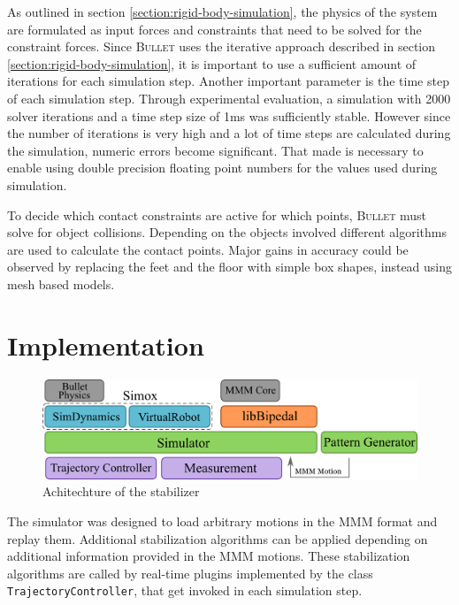 \documentclass[english,ngerman]{KITreprt}
\newcommand{\name}[1]{\textsc{#1}}
\begin{document}
As outlined in section \ref{section:rigid-body-simulation}, the physics
of the system are formulated as input forces and constraints that need
to be solved for the constraint forces. Since \name{Bullet} uses the
iterative approach described in section
\ref{section:rigid-body-simulation}, it is important to use a sufficient
amount of iterations for each simulation step. Another important
parameter is the time step of each simulation step. Through experimental
evaluation, a simulation with 2000 solver iterations and a time step
size of 1ms was sufficiently stable. However since the number of
iterations is very high and a lot of time steps are calculated during
the simulation, numeric errors become significant. That made is
necessary to enable using double precision floating point numbers for
the values used during simulation.

To decide which contact constraints are active for which points,
\name{Bullet} must solve for object collisions. Depending on the objects
involved different algorithms are used to calculate the contact points.
Major gains in accuracy could be observed by replacing the feet and the
floor with simple box shapes, instead using mesh based models.

\section{Implementation}\label{implementation-3}

\begin{figure}[htb]
\vspace*{-1em}
\includegraphics[width=\textwidth]{images/architechture.png}
\caption{Achitechture of the stabilizer}
\label{img:stabilitzer-achitechture}
\end{figure}

The simulator was designed to load arbitrary motions in the \name{MMM}
format and replay them. Additional stabilization algorithms can be
applied depending on additional information provided in the \name{MMM}
motions. These stabilization algorithms are called by real-time plugins
implemented by the class \texttt{TrajectoryController}, that get invoked
in each simulation step.
\end{document}
